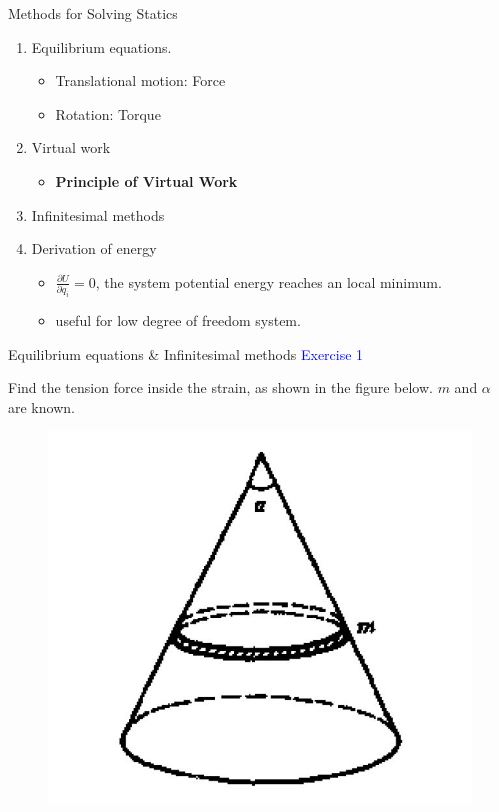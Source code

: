 \documentclass{beamer}
\begin{document}
\begin{frame}{Methods for Solving Statics}
  \begin{enumerate}
    \item Equilibrium equations. \pause
    \begin{itemize}
      \item Translational motion: Force \pause
      \item Rotation: Torque\pause
    \end{itemize}
    \item Virtual work\pause
    \begin{itemize}
      \item \textbf{Principle of Virtual Work}\pause
    \end{itemize}
    \item Infinitesimal methods\pause
    \item Derivation of energy\pause
    \begin{itemize}
      \item $\frac{\partial U}{\partial q_i} = 0$, the system potential energy reaches an local minimum.\pause
      \item useful for low degree of freedom system.
    \end{itemize}
  \end{enumerate}
\end{frame}

\begin{frame}{Equilibrium equations \& Infinitesimal methods}
\textcolor{blue}{Exercise 1}

Find the tension force inside the strain, as shown in the figure below. $m$ and $\alpha$ are known.
\begin{figure}[htbp]
\centering
\includegraphics[width=0.4 \linewidth, angle =0]{ex1.png}
\label{fig:1}
\end{figure}
\end{frame}
\end{document}
